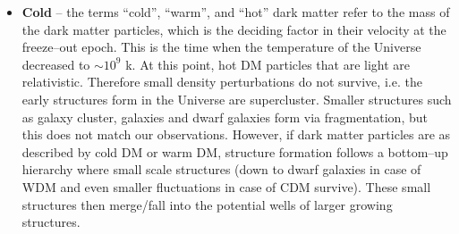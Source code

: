 \documentclass[paper=a4, fontsize=11pt]{scrartcl} %
\numberwithin{equation}{section} %
\numberwithin{figure}{section} %
\numberwithin{table}{section} %
\begin{document}
\begin{itemize}
  \item {\bf Cold} -- the terms ``cold'', ``warm'', and ``hot'' dark matter refer to the mass of the dark matter particles, which is the deciding factor in their velocity at the freeze--out epoch. This is the time when the temperature of the Universe decreased to $\sim 10^9$ k. At this point, hot DM particles that are light are relativistic. Therefore small density perturbations do not survive, i.e. the early structures form in the Universe are supercluster. Smaller structures such as galaxy cluster, galaxies and dwarf galaxies form via fragmentation, but this does not match our observations. However, if dark matter particles are as described by cold DM or warm DM, structure formation follows a bottom--up hierarchy where small scale structures (down to dwarf galaxies in case of WDM and even smaller fluctuations in case of CDM survive). These small structures then merge/fall into the potential wells of larger growing structures. 
  
  
  \end{itemize}
\end{document}
